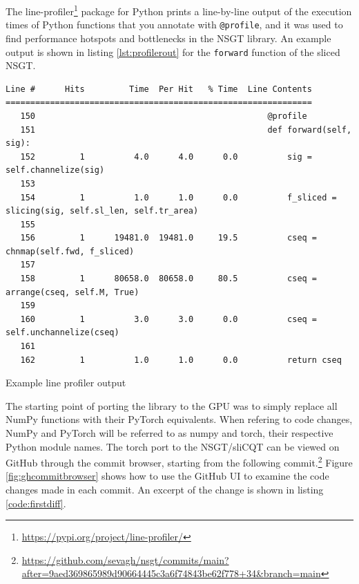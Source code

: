 \documentclass[report.tex]{subfiles}
\begin{document}
The line-profiler\footnote{\url{https://pypi.org/project/line-profiler/}} package for Python prints a line-by-line output of the execution times of Python functions that you annotate with \Verb#@profile#, and it was used to find performance hotspots and bottlenecks in the NSGT library. An example output is shown in listing \ref{lst:profilerout} for the \Verb#forward# function of the sliced NSGT.

\begin{listing}[h]
  \centering
\begin{verbatim}
Line #      Hits         Time  Per Hit   % Time  Line Contents
==============================================================
   150                                               @profile
   151                                               def forward(self, sig):
   152         1          4.0      4.0      0.0          sig = self.channelize(sig)
   153
   154         1          1.0      1.0      0.0          f_sliced = slicing(sig, self.sl_len, self.tr_area)
   155
   156         1      19481.0  19481.0     19.5          cseq = chnmap(self.fwd, f_sliced)
   157
   158         1      80658.0  80658.0     80.5          cseq = arrange(cseq, self.M, True)
   159
   160         1          3.0      3.0      0.0          cseq = self.unchannelize(cseq)
   161
   162         1          1.0      1.0      0.0          return cseq
\end{verbatim}
  \caption{Example line profiler output}
  \label{lst:profilerout}
\end{listing}

The starting point of porting the library to the GPU was to simply replace all NumPy functions with their PyTorch equivalents. When refering to code changes, NumPy and PyTorch will be referred to as numpy and torch, their respective Python module names. The torch port to the NSGT/sliCQT can be viewed on GitHub through the commit browser, starting from the following commit.\footnote{\url{https://github.com/sevagh/nsgt/commits/main?after=9aed369865989d90664445c3a6f74843be62f778+34&branch=main}} Figure \ref{fig:ghcommitbrowser} shows how to use the GitHub UI to examine the code changes made in each commit. An excerpt of the change is shown in listing \ref{code:firstdiff}.
\end{document}
